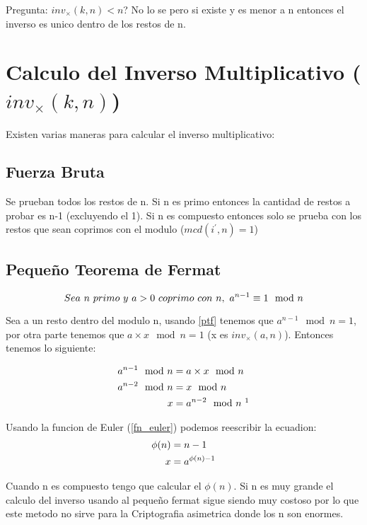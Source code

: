 \documentclass{article}
\begin{document}
Pregunta: $inv_{\times}(k,n) < n$? No lo se pero si existe y es menor a n entonces el inverso
es unico dentro de los restos de n.

\section{Calculo del Inverso Multiplicativo ($inv_{\times}(k,n)$)}
Existen varias maneras para calcular el inverso multiplicativo:

\subsection{Fuerza Bruta}
Se prueban todos los restos de n. Si n es primo entonces la cantidad de restos a probar es
n-1 (excluyendo el 1). Si n es compuesto entonces solo se prueba con los restos que sean
coprimos con el modulo ($mcd(i^{'}, n) = 1$)

\subsection{Pequeño Teorema de Fermat}
\begin{equation}
    \label{ptf}
    Sea \,\, n \,\, primo \,\, y \,\, a > 0 \,\, coprimo \,\, con \,\, n, \,\, a^{n-1} \equiv 1 \mod n
\end{equation}

Sea a un resto dentro del modulo n, usando \ref{ptf} tenemos que $a^{n-1} \mod n = 1$, por otra parte tenemos que
$a \times x \mod n = 1$ (x es $inv_{\times}(a,n)$). Entonces tenemos lo siguiente:

\begin{align}
    \notag a^{n-1} \mod n &= a \times x \mod n\\
    \notag a ^{n-2} \mod n &= x \mod n\\
    \notag x &= a^{n-2} \mod n \SP \footnotemark
\end{align}

Usando la funcion de Euler (\ref{fn_euler}) podemos reescribir la ecuadion:
\begin{align}
    \notag \phi(n) &= n-1\\
    \notag x &= a^{\phi(n) -1}
\end{align}

Cuando n es compuesto tengo que calcular el $\phi(n)$. Si n es muy grande el calculo del inverso
usando al pequeño fermat sigue siendo muy costoso por lo que este metodo no sirve para la
Criptografia asimetrica donde los n son enormes.
\end{document}
